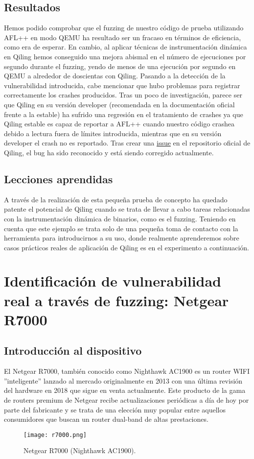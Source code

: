 \subsection{Resultados}
Hemos podido comprobar que el fuzzing de nuestro código de prueba utilizando AFL++ en modo QEMU ha resultado ser un fracaso en términos de 
eficiencia, como era de esperar. En cambio,
al aplicar técnicas de instrumentación dinámica en Qiling hemos conseguido una mejora abismal en el número de ejecuciones por segundo durante el fuzzing, 
yendo de menos de una ejecución por segundo en QEMU a alrededor de doscientas con Qiling. Pasando a la detección de la vulnerabilidad introducida, 
cabe mencionar que hubo problemas para registrar correctamente los crashes producidos. Tras un poco de investigación, parece ser que Qiling en su versión developer
(recomendada en la documentación oficial frente a la estable) ha sufrido una regresión en el tratamiento de crashes ya que Qiling estable es capaz de 
reportar a AFL++ cuando nuestro código crashea debido a lectura fuera de límites introducida, mientras que en su versión developer el crash no es reportado.
Tras crear una \href{https://github.com/qilingframework/qiling/issues/1163}{issue} en el repositorio oficial de Qiling\cite{qiling}, el bug ha sido reconocido y está siendo corregido actualmente.


\subsection{Lecciones aprendidas}
A través de la realización de esta pequeña prueba de concepto ha quedado patente el potencial de Qiling cuando se trata de llevar a cabo tareas relacionadas
con la instrumentación dinámica de binarios, como es el fuzzing. Teniendo en cuenta que este ejemplo se trata solo de una pequeña toma de contacto con la herramienta
para introducirnos a su uso, donde realmente aprenderemos sobre casos prácticos reales de aplicación de Qiling es en el experimento a continuación.

\section{Identificación de vulnerabilidad real a través de fuzzing: Netgear R7000}\label{r7000_section}
\subsection{Introducción al dispositivo}
El Netgear R7000, también conocido como Nighthawk AC1900 es un router WIFI ''inteligente'' lanzado al mercado originalmente en 2013 con una última
revisión del hardware en 2018 que sigue en venta actualmente. Este producto de la gama de routers premium de Netgear recibe actualizaciones periódicas
a día de hoy por parte del fabricante y se trata de una elección muy popular entre aquellos consumidores que buscan un router dual-band de altas prestaciones. 
\begin{figure}[H]
    \centering
    \texttt{[image: r7000.png]}
    \caption{Netgear R7000 (Nighthawk AC1900).}
    \label{fig:r7000}
\end{figure}

